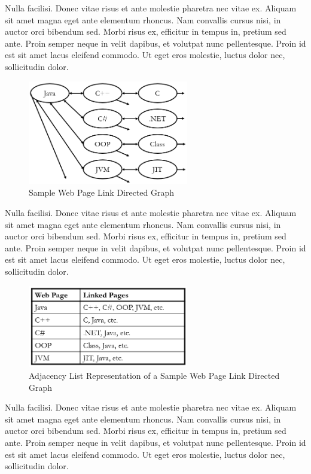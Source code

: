 \documentclass[sigconf,nonacm,11pt]{acmart}
\begin{document}
Nulla facilisi. Donec vitae risus et ante molestie pharetra nec vitae ex. Aliquam sit amet magna eget ante elementum rhoncus. Nam convallis cursus nisi, in auctor orci bibendum sed. Morbi risus ex, efficitur in tempus in, pretium sed ante. Proin semper neque in velit dapibus, et volutpat nunc pellentesque. Proin id est sit amet lacus eleifend commodo. Ut eget eros molestie, luctus dolor nec, sollicitudin dolor.

\begin{figure}[h]
  \centering
  \includegraphics[width=7cm]{Fig7Wiki1}
  \caption{Sample Web Page Link Directed Graph}
  \label{fig:wiki1}
\end{figure}

Nulla facilisi. Donec vitae risus et ante molestie pharetra nec vitae ex. Aliquam sit amet magna eget ante elementum rhoncus. Nam convallis cursus nisi, in auctor orci bibendum sed. Morbi risus ex, efficitur in tempus in, pretium sed ante. Proin semper neque in velit dapibus, et volutpat nunc pellentesque. Proin id est sit amet lacus eleifend commodo. Ut eget eros molestie, luctus dolor nec, sollicitudin dolor.

\begin{figure}[h]
  \centering
  \includegraphics[width=7cm]{Fig8Wiki2}
  \caption{Adjacency List Representation of a Sample Web Page Link Directed Graph}
  \label{fig:wiki2}
\end{figure}

Nulla facilisi. Donec vitae risus et ante molestie pharetra nec vitae ex. Aliquam sit amet magna eget ante elementum rhoncus. Nam convallis cursus nisi, in auctor orci bibendum sed. Morbi risus ex, efficitur in tempus in, pretium sed ante. Proin semper neque in velit dapibus, et volutpat nunc pellentesque. Proin id est sit amet lacus eleifend commodo. Ut eget eros molestie, luctus dolor nec, sollicitudin dolor.
\end{document}
